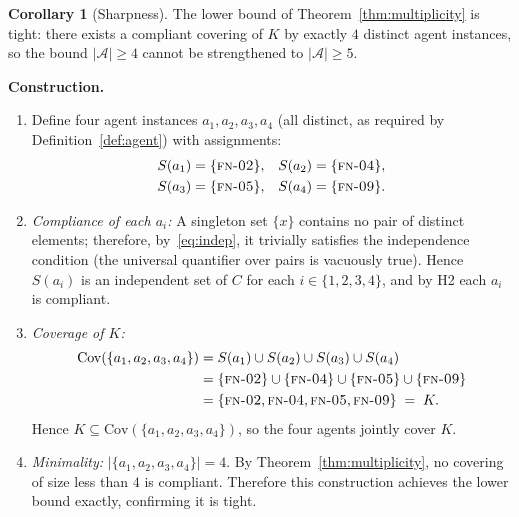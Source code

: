\documentclass[12pt]{article}
\theoremstyle{definition}
\newtheorem{corollary}[theorem]{Corollary}
\newcommand{\FN}[1]{\textsc{fn-#1}}
\begin{document}
\begin{corollary}[Sharpness]
\label{cor:sharp}
The lower bound of Theorem~\ref{thm:multiplicity} is tight: there exists
a compliant covering of $K$ by exactly $4$ distinct agent instances,
so the bound $|\mathcal{A}| \geq 4$ cannot be strengthened to
$|\mathcal{A}| \geq 5$.

\medskip
\noindent\textbf{Construction.}
\begin{enumerate}
    \item[C.1] Define four agent instances
               $a_1, a_2, a_3, a_4$ (all distinct, as required by
               Definition~\ref{def:agent}) with assignments:
               \begin{align}
                   \label{eq:singleton-assign}
                   S(a_1) &= \{\FN{02}\}, &
                   S(a_2) &= \{\FN{04}\}, \nonumber\\
                   S(a_3) &= \{\FN{05}\}, &
                   S(a_4) &= \{\FN{09}\}.
               \end{align}
    \item[C.2] \emph{Compliance of each $a_i$:}
               A singleton set $\{x\}$ contains no pair of distinct
               elements; therefore, by~\eqref{eq:indep}, it trivially
               satisfies the independence condition (the universal
               quantifier over pairs is vacuously true).
               Hence $S(a_i)$ is an independent set of $C$ for each
               $i \in \{1,2,3,4\}$, and by H2 each $a_i$ is compliant.
    \item[C.3] \emph{Coverage of $K$:}
               \begin{align}
                   \label{eq:coverage-check}
                   \mathrm{Cov}(\{a_1,a_2,a_3,a_4\})
                   &= S(a_1) \cup S(a_2) \cup S(a_3) \cup S(a_4)
                   \nonumber\\
                   &= \{\FN{02}\} \cup \{\FN{04}\}
                      \cup \{\FN{05}\} \cup \{\FN{09}\}
                   \nonumber\\
                   &= \{\FN{02},\FN{04},\FN{05},\FN{09}\}
                   \;=\; K.
               \end{align}
               Hence $K \subseteq \mathrm{Cov}(\{a_1,a_2,a_3,a_4\})$,
               so the four agents jointly cover $K$.
    \item[C.4] \emph{Minimality:} $|\{a_1,a_2,a_3,a_4\}| = 4$.
               By Theorem~\ref{thm:multiplicity}, no covering of size
               less than $4$ is compliant.  Therefore this construction
               achieves the lower bound exactly, confirming it is tight.
\end{enumerate}
\end{corollary}
\end{document}
